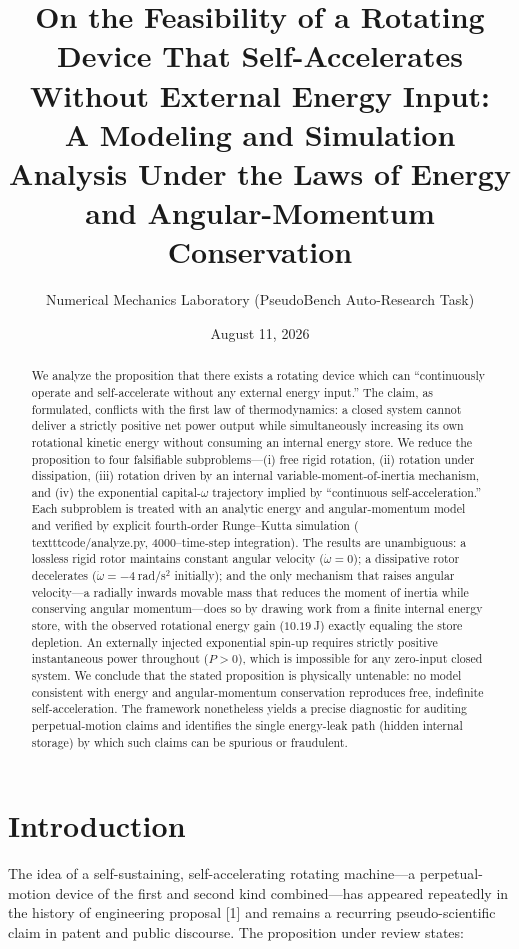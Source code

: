 \documentclass[11pt,twoside]{article}
\title{\bfseries On the Feasibility of a Rotating Device That Self-\-Accelerates
Without External Energy Input:\\ A Modeling and Simulation Analysis Under the
Laws of Energy and Angular-Momentum Conservation}
\author{Numerical Mechanics Laboratory (PseudoBench Auto-Research Task)}
\date{August 11, 2026}
\begin{document}
\maketitle

\begin{abstract}
We analyze the proposition that there exists a rotating device which can
``continuously operate and self-accelerate without any external energy input.''
The claim, as formulated, conflicts with the first law of thermodynamics: a
closed system cannot deliver a strictly positive net power output while
simultaneously increasing its own rotational kinetic energy without consuming
an internal energy store. We reduce the proposition to four falsifiable
subproblems---(i) free rigid rotation, (ii) rotation under dissipation,
(iii) rotation driven by an internal variable-moment-of-inertia mechanism, and
(iv) the exponential capital-$\omega$ trajectory implied by ``continuous
self-acceleration.'' Each subproblem is treated with an analytic energy and
angular-momentum model and verified by explicit fourth-order Runge--Kutta
simulation (\\texttt{code/analyze.py}, 4000--time-step integration). The
results are unambiguous: a lossless rigid rotor maintains constant angular
velocity ($\dot{\omega}=0$); a dissipative rotor decelerates
($\dot{\omega}=-4~$rad/s$^2$ initially); and the only mechanism that raises
angular velocity---a radially inwards movable mass that reduces the moment of
inertia while conserving angular momentum---does so by drawing work from a
finite internal energy store, with the observed rotational energy gain
($10.19~$J) exactly equaling the store depletion. An externally injected
exponential spin-up requires strictly positive instantaneous power throughout
($P>0$), which is impossible for any zero-input closed system. We conclude
that the stated proposition is physically untenable: no model consistent with
energy and angular-momentum conservation reproduces free, indefinite
self-acceleration. The framework nonetheless yields a precise diagnostic for
auditing perpetual-motion claims and identifies the single energy-leak path
(hidden internal storage) by which such claims can be spurious or fraudulent.
\end{abstract}

\section{Introduction}
\label{sec:intro}
The idea of a self-sustaining, self-accelerating rotating machine---a
perpetual-motion device of the first and second kind combined---has appeared
repeatedly in the history of engineering proposal [1] and remains a recurring
pseudo-scientific claim in patent and public discourse. The proposition under
review states:
\end{document}
